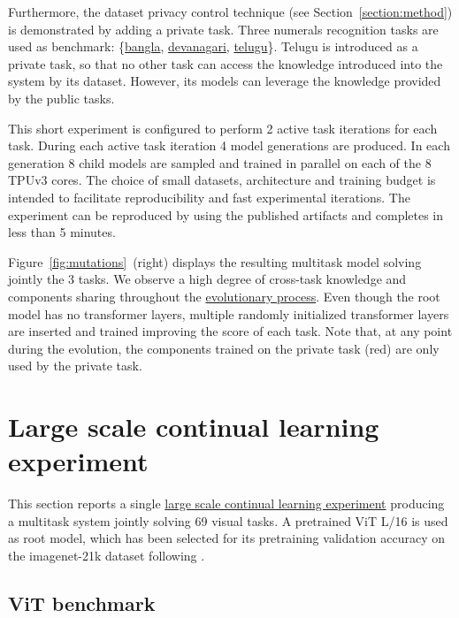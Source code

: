 \documentclass{article} \usepackage{iclr2023_conference,times}
\begin{document}
Furthermore, the dataset privacy control technique (see Section~\ref{section:method}) is demonstrated by adding a private task.
Three numerals recognition tasks are used as benchmark:
\{\href{https://www.tensorflow.org/datasets/catalog/cmaterdb#cmaterdbbangla_default_config}{bangla}, 
\href{https://www.tensorflow.org/datasets/catalog/cmaterdb#cmaterdbdevanagari}{devanagari},
\href{https://www.tensorflow.org/datasets/catalog/cmaterdb#cmaterdbtelugu}{telugu}\}.
Telugu is introduced as a private task,
so that no other task can access the knowledge introduced into the system by its dataset.
However, its models can leverage the knowledge provided by the public tasks.


This short experiment is configured to perform 2 active task iterations for each task.
During each active task iteration 4 model generations are produced.
In each generation 8 child models are sampled and trained in parallel on each of the 8 TPUv3 cores.
The choice of small datasets, architecture and training budget is intended to facilitate reproducibility and fast experimental iterations.
The experiment can be reproduced by using the published artifacts and completes in less than 5 minutes.

Figure~\ref{fig:mutations}~(right) displays the resulting multitask model solving jointly the 3 tasks.
We observe a high degree of cross-task knowledge and components sharing throughout the \href{https://youtu.be/Pcin4hPGaOk}{evolutionary process}.
Even though the root model has no transformer layers, multiple randomly initialized transformer layers are inserted and trained improving the score of each task.
Note that, at any point during the evolution, the components trained on the private task (red) are only used by the private task. 



\section{Large scale continual learning experiment}
\label{section:large-exp}
This section reports a single \href{https://youtu.be/Hf88Ge0eiQ8}{large scale continual learning experiment} producing a multitask system jointly solving 69 visual tasks.
A pretrained ViT L/16 is used as root model, which has been selected for its
pretraining validation accuracy on the imagenet-21k dataset following \citet{Steiner2021HowTT}.



\subsection{ViT benchmark}
\label{subsection:imagenet}
\end{document}

